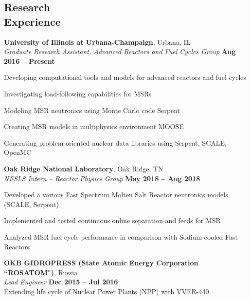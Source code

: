 \documentclass[margin,line]{resume}
\begin{document}
\begin{resume}
    \section{\mysidestyle Research\\Experience}               
    \textbf{University of Illinois at Urbana-Champaign}, Urbana, IL\\
		\textsl{Graduate Research Assistant, Advanced Reactors and Fuel Cycles Group} \hfill \textbf{Aug 2016 -- Present}\\
                \vspace{-4mm}\begin{list2}
                \item Developing computational tools and models for advanced 
                reactors and fuel cycles
                \item Investigating load-following capabilities for MSRs
                \item Modeling MSR neutronics using Monte Carlo code 
                Serpent
				\item Creating MSR models in multiphysics environment MOOSE
				\item Generating problem-oriented nuclear data libraries using 
				Serpent, SCALE, OpenMC
                \end{list2}

    \textbf{Oak Ridge National Laboratory}, Oak Ridge, TN\\
		\textsl{NESLS Intern -- Reactor Physics Group} \hfill \textbf{May 2018 
		-- Aug 2018}\\
                \vspace{-4mm}\begin{list2}
                \item Developed a various Fast Spectrum Molten Salt Reactor 
                neutronics models (SCALE, Serpent)
				\item Implemented and tested continuous online separation and 
				feeds for MSR
				\item Analyzed MSR fuel cycle performance in comparison with 
				Sodium-cooled Fast Reactors
                \end{list2}

    \textbf{OKB GIDROPRESS (State Atomic Energy Corporation ``ROSATOM")}, 
    Russia \\
		\textsl{Lead Engineer} \hfill \textbf{Dec 2015 -- Jul 2016}\\
                Extending life cycle of Nuclear Power Plants (NPP) with 
                VVER-440


\end{resume}
\end{document}
